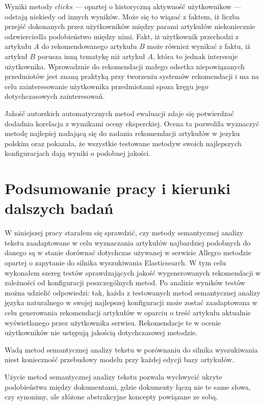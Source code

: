 \documentclass[pl]{minipw} %
\begin{document}
Wyniki metody $clicks$ --- opartej o historyczną aktywność użytkownikow --- odstają niekiedy od innych wyników. Może się to wiązać z faktem, iż liczba przejść dokonanych przez użytkowników między parami artykułów niekoniecznie odzwierciedla podobieństwo między nimi. Fakt, iż użytkownik przechodzi z artykułu $A$ do rekomendowanego artykułu $B$ może również wynikać z faktu, iż artykuł $B$ porusza inną tematykę niż artykuł $A$, która to jednak interesuje użytkownika. Wprowadznie do rekomendacji małego odsetka niepowiązanych przedmiotów jest znaną praktyką przy tworzeniu systemów rekomendacji i ma na celu zainteresowanie użytkownika przedmiotami spoza kręgu jego dotychczasowych zainteresowań.

Jakość autorskich automatycznych metod ewaluacji zdaje się potwierdzać dodadnia korelacja z wymikami oceny eksperckiej. Ocena ta pozwoliła wyznaczyć metodę najlepiej nadającą się do zadania rekomendacji artykułów w jezyku polskim oraz pokazała, że wszystkie testowane metodyw swoich najlepszych konfiguracjach dają wyniki o podobnej jakości. 


\chapter{Podsumowanie pracy i kierunki dalszych badań}

W niniejszej pracy starałem się sprawdzić, czy metody semantycznej analizy tekstu zaadaptowane w celu wyznaczania artykułów najbardziej podobnych do danego są w stanie dorównać dotychczas używanej w serwisie Allegro metodzie opartej o zapytanie do silnika wyszukiwania Elasticsearch. W tym celu wykonałem szereg testów sprawdzających jakość wygenerowanych rekomendacji w zależności od konfiguracji poszczególnych metod. Po analizie wyników testów można udzielić odpowiedzi: tak, każda z testowanych metod semantycznej analizy języka naturalnego w swojej najlepszej konfiguracji może zostać zaadaptowana w celu generowania rekomendacji artykułów w oparciu o treść artykułu aktualnie wyświetlanego przez użytkownika serwisu. Rekomendacje te w ocenie  użytkowników nie ustępują jakością dotychczasowej metodzie. 


Wadą metod semantycznej analizy tekstu w porównaniu do silnika wyszukiwania niest konieczność przebudowy modelu przy każdej edycji bazy artykułów.

Użycie metod semantycznej analizy tekstu pozwala wychwycić ukryte podobieństwa między dokumentami, gdzie dokumenty łączą nie te same słowa, czy synonimy, ale złóżone abstrakcyjne koncepty powiązane ze sobą.
\end{document}
